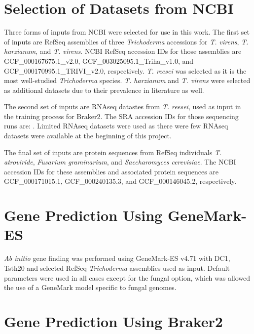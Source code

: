 \section{Selection of Datasets from NCBI}
\label{met:datasets}

Three forms of inputs from NCBI were selected for use in this
work. The first set of inputs are RefSeq assemblies of three
\textit{Trichoderma} accessions for \textit{T. virens},
\textit{T. harzianum}, and \textit{T. virens}. NCBI RefSeq accession
IDs for those assemblies are GCF\_000167675.1\_v2.0,
GCF\_003025095.1\_Triha\_v1.0, and GCF\_000170995.1\_TRIVI\_v2.0,
respectively. \textit{T. reesei} was selected as it is the most
well-studied \textit{Trichoderma} species. \textit{T. harzianum} and
\textit{T. virens} were selected as additional datasets due to their
prevalence in literature as well.

The second set of inputs are RNAseq datastes from \textit{T. reesei},
used as input in the training process for Braker2. The SRA accession
IDs for those sequencing runs are: . Limited RNAseq datasets were used
as there were few RNAseq datasets were available at the beginning of
this project.

The final set of inputs are protein sequences from RefSeq individuals
\textit{T. atroviride}, \textit{Fusarium graminarium}, and
\textit{Saccharomyces cerevisiae}. The NCBI accession IDs for these
assemblies and associated protein sequences are GCF\_000171015.1,
GCF\_000240135.3, and GCF\_000146045.2, respectively.

\section{Gene Prediction Using GeneMark-ES}
\label{met:genemark}


\textit{Ab initio} gene finding was performed using GeneMark-ES
v4.71\cite{Borodovsky2011} with DC1, Tsth20 and selected RefSeq
\textit{Trichoderma} assemblies used as input. Default parameters were
used in all cases except for the fungal option, which was allowed the
use of a GeneMark model specific to fungal genomes.

%

\section{Gene Prediction Using Braker2}
\label{met:braker2}

